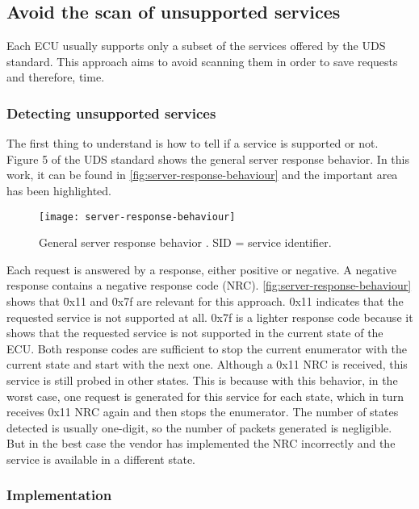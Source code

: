\subsection{Avoid the scan of unsupported services}

Each ECU usually supports only a subset of the services offered  by the UDS standard. This approach aims to avoid scanning them in order to save requests and therefore, time.

\subsubsection{Detecting unsupported services}

The first thing to understand is how to tell if a service is supported or not. Figure 5 of the UDS standard shows the general server response behavior. In this work, it can be found in \autoref{fig:server-response-behaviour} and the important area has been highlighted.

\begin{figure}[h]
    \centering
    \texttt{[image: server-response-behaviour]}
    \caption{General server response behavior \cite{iso14229}. SID = service identifier.}
    \label{fig:server-response-behaviour}
\end{figure}

Each request is answered by a response, either positive or negative. A negative response contains a negative response code (NRC). \autoref{fig:server-response-behaviour} shows that 0x11 and 0x7f are relevant for this approach. 0x11 indicates that the requested service is not supported at all. 0x7f is a lighter response code because it shows that the requested service is not supported in the current state of the ECU. Both response codes are sufficient to stop the current enumerator with the current state and start with the next one. Although a 0x11 NRC is received, this service is still probed in other states. This is because with this behavior, in the worst case, one request is generated for this service for each state, which in turn receives 0x11 NRC again and then stops the enumerator. The number of states detected is usually one-digit, so the number of packets generated is negligible. But in the best case the vendor has implemented the NRC incorrectly and the service is available in a different state.

\subsubsection{Implementation}

